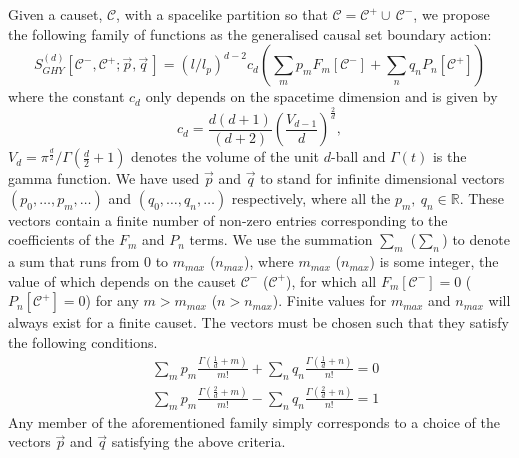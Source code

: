 \documentclass[12pt]{article}
\newcommand{\be}{\begin{equation}}
\newcommand{\ee}{\end{equation}}
\newcommand{\F}[1]{F_{#1}}
\renewcommand{\P}[1]{P_{#1}}
\begin{document}
Given a causet, $\mathcal{C}$, with a spacelike partition so that $\mathcal C = \mathcal C^+ \cup\, \mathcal C^-$, we propose the following family of functions as the generalised causal set boundary action:
\be\label{general_boundary_sum}
S^{ (d)}_{GHY}\left[\mathcal{C}^-,\mathcal{C}^+;\vec{p}, \vec{q}\,\right]= \left (l/l_p\right)^{d-2} c_{d}
\left ( \sum_m p_m \F{m}\left[\mathcal{C}^- \right]
+  \sum_n q_n \P{n}\left[\mathcal{C}^+ \right]\right)
\ee
where the constant $c_{d}$ only depends on the spacetime dimension and is given by
\be\label{Cn}
c_{d}=\frac{d (d+1)}{ (d+2)}\left(\frac{V_{d-1}}{d}\right)^{\frac{2}{d}},
\ee
$V_d=\pi^{\frac{d}{2}}/\Gamma\left (\frac{d}{2}+1\right)$ denotes the volume of the unit $d$-ball and $\Gamma (t)$ is the gamma function. We have used $\vec{p}$ and $\vec{q}$ to stand for infinite dimensional vectors $ (p_0,\ldots,p_m,\ldots)$ and $ (q_0,\ldots,q_n,\ldots)$ respectively, where all the $p_m,\: q_n \in \mathbb{R}$. These vectors contain a finite number of non-zero entries corresponding to the coefficients of the $\F{m}$ and $\P{n}$ terms. We use the summation $\sum_m$ ($\sum_n$) to denote a sum that runs from $0$ to $m_{max}$ ($n_{max}$), where $m_{max}$ ($n_{max}$) is some integer, the value of which depends on the causet $\mathcal{C}^-$ ($\mathcal{C}^+$), for which all $\F{m}\left[\mathcal{C}^- \right]=0$ ($\P{n}\left[\mathcal{C}^+ \right]=0$) for any $m>m_{max}$ ($n>n_{max}$). Finite values for $m_{max}$ and $n_{max}$ will always exist for a finite causet. The vectors must be chosen such that they satisfy the following conditions.
\begin{align}\label{coefficient_relation1}
& \sum_m p_m \frac{\Gamma\left (\frac{1}{d}+m \right)}{m!}  + \sum_n q_n\frac{\Gamma\left (\frac{1}{d}+n \right)}{n!}=0
\\
& \label{coefficient_relation2}\sum_m p_m \frac{\Gamma\left (\frac{2}{d}+m \right)}{m!}  - \sum_n q_n\frac{\Gamma\left (\frac{2}{d}+n \right)}{n!}=1
\end{align}
Any member of the aforementioned family simply corresponds to a choice of the vectors $\vec{p}$ and $\vec{q}$ satisfying the above criteria.
\end{document}
